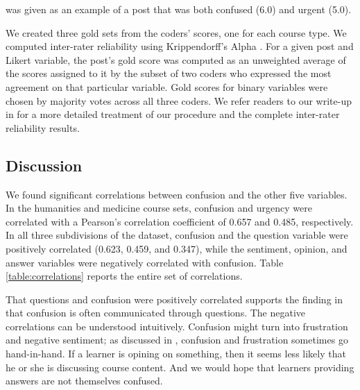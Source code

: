 \documentclass{edm_template}
\begin{document}
was given as an example of a post that was both confused (6.0) and urgent (5.0).

We created three gold sets from the coders' scores, one for each course type. We computed inter-rater reliability using Krippendorff's Alpha \cite{hayes2007answering}. For a given post and Likert variable, the post's gold score was computed as an unweighted average of the scores assigned to it by the subset of two coders who expressed the most agreement on that particular variable. Gold scores for binary variables were chosen by majority votes across all three coders. We refer readers to our write-up in \cite{stanfordMOOCPosts} for a more detailed treatment of our procedure and the complete inter-rater reliability results.


\subsection{Discussion}
We found significant correlations between confusion and the other five variables. In the humanities and medicine course sets, confusion and urgency were correlated with a Pearson's correlation coefficient of 0.657 and 0.485, respectively. In all three subdivisions of the dataset, confusion and the question variable were positively correlated (0.623, 0.459, and 0.347), while the sentiment, opinion, and answer variables were negatively correlated with confusion. Table \ref{table:correlations} reports the entire set of correlations.

That questions and confusion were positively correlated supports the finding in \cite{wilson1989learning} that confusion is often communicated through questions. The negative correlations can be understood intuitively. Confusion might turn into frustration and negative sentiment; as discussed in \cite{liu2013sequences}, confusion and frustration sometimes go hand-in-hand. If a learner is opining on something, then it seems less likely that he or she is discussing course content. And we would hope that learners providing answers are not themselves confused.
\end{document}
